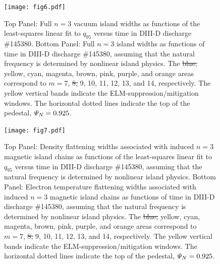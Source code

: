 \documentclass[12pt,prb,aps]{revtex4-1}
\providecommand{\DIFadd}[1]{{\protect\color{blue}\uwave{#1}}} %
\providecommand{\DIFdel}[1]{{\protect\color{red}\sout{#1}}}                      %
\providecommand{\DIFaddFL}[1]{\DIFadd{#1}} %
\providecommand{\DIFdelFL}[1]{\DIFdel{#1}} %
\providecommand{\DIFaddbeginFL}{} %
\providecommand{\DIFaddendFL}{} %
\providecommand{\DIFdelbeginFL}{} %
\providecommand{\DIFdelendFL}{} %
\begin{document}
\begin{figure}
\DIFdelbeginFL %
\DIFdelendFL \DIFaddbeginFL \texttt{[image: fig6.pdf]}
\DIFaddendFL \caption{Top Panel: Full  $n=3$ vacuum island widths as functions of the least-squares linear fit to $q_{95}$ versus time 
in   DIII-D discharge \#145380.
Bottom Panel:  Full $n=3$ island widths as functions of time
in   DIII-D discharge \#145380, assuming that the natural frequency is determined by nonlinear island physics. The \DIFdelbeginFL \DIFdelFL{blue, }\DIFdelendFL yellow, cyan, magenta, brown, pink,
purple, and orange  areas correspond to \DIFdelbeginFL \DIFdelFL{$m=7$}\DIFdelendFL \DIFaddbeginFL \DIFaddFL{$m=8$}\DIFaddendFL , \DIFdelbeginFL \DIFdelFL{8, }\DIFdelendFL 9, 10, 11, 12, 13, and 14, respectively. The yellow vertical bands indicate the ELM-suppression/mitigation windows. 
The horizontal dotted lines indicate the top of the pedestal, ${\mit\Psi}_N=0.925$.} \label{fig6}
\end{figure}

\begin{figure}
\DIFdelbeginFL %
\DIFdelendFL \DIFaddbeginFL \texttt{[image: fig7.pdf]}
\DIFaddendFL \caption{Top Panel: Density flattening widths associated with induced $n=3$ magnetic island  chains as functions of the least-squares linear fit to $q_{95}$ versus time
in   DIII-D discharge \#145380, assuming that the natural frequency is determined by nonlinear island physics.
Bottom Panel:  Electron temperature flattening widths associated with induced $n=3$ magnetic island chains as functions of time
in   DIII-D discharge \#145380, assuming that the natural frequency is determined by nonlinear island physics. The \DIFdelbeginFL \DIFdelFL{blue, }\DIFdelendFL yellow, cyan, magenta, brown, pink,
purple, and orange  areas correspond to \DIFdelbeginFL \DIFdelFL{$m=7$}\DIFdelendFL \DIFaddbeginFL \DIFaddFL{$m=8$}\DIFaddendFL , \DIFdelbeginFL \DIFdelFL{8, }\DIFdelendFL 9, 10, 11, 12, 13, and 14, respectively. The yellow vertical bands indicate the ELM-suppression/mitigation windows. 
The horizontal dotted lines indicate the top of the pedestal, ${\mit\Psi}_N=0.925$.} \label{fig7}
\end{figure}
\end{document}

